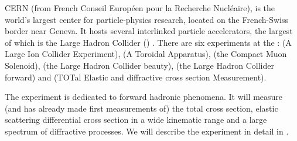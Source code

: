 CERN  (from French Conseil Europ\' een pour la Recherche Nucl\' eaire), is the world's largest center for particle-physics research, located on the French-Swiss border near Geneva. It hosts several interlinked particle accelerators, the largest of which is the Large Hadron Collider () . There are six experiments at the :  (A Large Ion Collider Experiment),  (A Toroidal  Apparatus),  (the Compact Muon Solenoid),  (the Large Hadron Collider beauty),  (the Large Hadron Collider forward) and  (TOTal Elastic and diffractive cross section Measurement).




The  experiment is dedicated to forward hadronic phenomena. It will measure (and has already made first measurements of) the total cross section, elastic scattering differential cross section in a wide kinematic range and a large spectrum of diffractive processes. We will describe the experiment in detail in .


